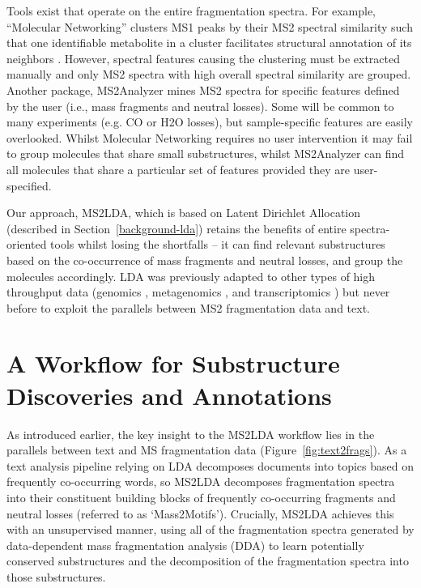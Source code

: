Tools exist that operate on the entire fragmentation spectra. For example, “Molecular Networking” clusters MS1 peaks by their MS2 spectral similarity such that one identifiable metabolite in a cluster facilitates structural annotation of its neighbors \cite{yang2013molecular, van2016urinary}.  However, spectral features causing the clustering must be extracted manually and only MS2 spectra with high overall spectral similarity are grouped. Another package, MS2Analyzer \cite{ma2014ms2analyzer} mines MS2 spectra for specific features defined by the user (i.e., mass fragments and neutral losses). Some will be common to many experiments (e.g. CO or H2O losses), but sample-specific features are easily overlooked. Whilst Molecular Networking requires no user intervention it may fail to group molecules that share small substructures, whilst MS2Analyzer can find all molecules that share a particular set of features provided they are user-specified. 

Our approach, MS2LDA, which is based on Latent Dirichlet Allocation (described in Section~\ref{background-lda}) retains the benefits of entire spectra-oriented tools whilst losing the shortfalls – it can find relevant substructures based on the co-occurrence of mass fragments and neutral losses, and group the molecules accordingly. LDA was previously adapted to other types of high throughput data (genomics \cite{chen2010probabilistic}, metagenomics \cite{zhang2015exploiting}, and transcriptomics \cite{rogers2005latent}) but never before to exploit the parallels between MS2 fragmentation data and text.

\section{A Workflow for Substructure Discoveries and Annotations}

As introduced earlier, the key insight to the MS2LDA workflow lies in the parallels between text and MS fragmentation data (Figure~\ref{fig:text2frags}). As a text analysis pipeline relying on LDA decomposes documents into topics based on frequently co-occurring words, so MS2LDA decomposes fragmentation spectra into their constituent building blocks of frequently co-occurring fragments and neutral losses (referred to as ‘Mass2Motifs’). Crucially, MS2LDA achieves this with an unsupervised manner, using all of the fragmentation spectra generated by data-dependent mass fragmentation analysis (DDA) to learn potentially conserved substructures and the decomposition of the fragmentation spectra into those substructures. 


